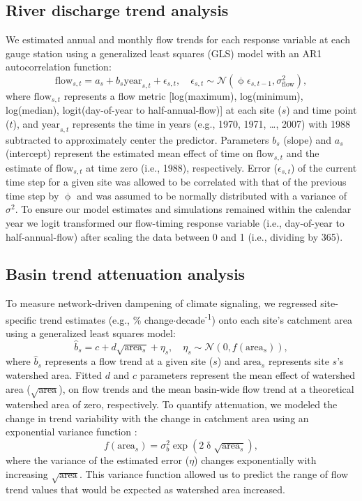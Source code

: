 \documentclass[9pt,twocolumn,twoside,lineno]{pnas-new}
\begin{document}
{\subsection*{River discharge trend analysis} We estimated annual and monthly flow trends for each response variable at each gauge station using a generalized least squares (GLS) model with an AR1 autocorrelation function:
\begin{equation}
  \mathrm{flow}_{s,t} = a_s + b_s \mathrm{year}_{s,t} + \epsilon_{s,t}, \quad 
  \epsilon_{s,t} \sim \mathcal{N}(\upphi \epsilon_{s,t-1}, \sigma_\mathrm{flow}^2) \label{eq1},
\end{equation}
where $\mathrm{flow}_{s,t}$ represents a flow metric [log(maximum), log(minimum), log(median), logit(day-of-year to half-annual-flow)] at each site ($s$) and time point ($t$),  and $\mathrm{year}_{s,t}$ represents the time in years (e.g., 1970, 1971, \ldots, 2007) with 1988 subtracted to approximately center the predictor. Parameters $b_{s}$ (slope) and $a_{s}$ (intercept) represent the estimated mean effect of time on $\mathrm{flow}_{s,t}$ and the estimate of $\mathrm{flow}_{s,t}$ at time zero (i.e., 1988), respectively. Error ($\epsilon_{s,t}$) of the current time step for a given site was allowed to be correlated with that of the previous time step by $\upphi$ and was assumed to be normally distributed with a variance of $\sigma^{2}$. To ensure our model estimates and simulations remained within the calendar year we logit transformed our flow-timing response variable (i.e., day-of-year to half-annual-flow) after scaling the data between 0 and 1 (i.e., dividing by 365).

\subsection*{Basin trend attenuation analysis} To measure network-driven dampening of climate signaling, we regressed site-specific trend estimates (e.g., \% change$\cdot$decade\textsuperscript{-1}) onto each site's catchment area using a generalized least squares model:
\begin{equation}
	\hat{b}_{s} = c + d\sqrt{\mathrm{area}_{s}} + \eta_{s}, \quad
  \eta_{s} \sim \mathcal{N}(0, f(\mathrm{area}_{s})) \label{eq2},
\end{equation}
where $\hat{b}_{s}$ represents a flow trend at a given site ($s$) and $\mathrm{area}_{s}$ represents site $s$'s watershed area. Fitted $d$ and $c$ parameters represent the mean effect of watershed area ($\sqrt{\mathrm{area}}$), on flow trends and the mean basin-wide flow trend at a theoretical watershed area of zero, respectively. To quantify attenuation, we modeled the change in trend variability with the change in catchment area using an exponential variance function \cite[p.~211]{Pinheiro:2000}: 
\begin{equation}
	f(\mathrm{area}_{s}) = \sigma_b^2 \exp(2\updelta\sqrt{\mathrm{area}_{s}}) \label{eq3},
\end{equation}
where the variance of the estimated error ($\eta$) changes exponentially with increasing $\sqrt{\mathrm{area}}$. This variance function allowed us to predict the range of flow trend values that would be expected as watershed area increased. 

}
\end{document}

